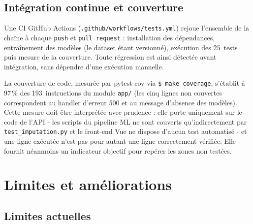 \documentclass[12pt,a4paper,openany]{report}
\newcommand{\file}[1]{\texttt{#1}}
\newcommand{\cmd}[1]{\texttt{\$ #1}}
\begin{document}
\section{Intégration continue et couverture}

Une CI GitHub Actions (\file{.github/workflows/tests.yml}) rejoue l'ensemble de la chaîne à chaque \texttt{push} et \texttt{pull request} : installation des dépendances, entraînement des modèles (le dataset étant versionné), exécution des 25~tests puis mesure de la couverture. Toute régression est ainsi détectée avant intégration, sans dépendre d'une exécution manuelle.

La couverture de code, mesurée par pytest-cov via \cmd{make coverage}, s'établit à 97\,\% des 193~instructions du module \file{app/} (les cinq lignes non couvertes correspondent au handler d'erreur 500 et au message d'absence des modèles). Cette mesure doit être interprétée avec prudence : elle porte uniquement sur le code de l'API - les scripts du pipeline ML ne sont couverts qu'indirectement par \file{test\_imputation.py} et le front-end Vue ne dispose d'aucun test automatisé - et une ligne exécutée n'est pas pour autant une ligne correctement vérifiée. Elle fournit néanmoins un indicateur objectif pour repérer les zones non testées.


\chapter{Limites et améliorations}

\section{Limites actuelles}
\end{document}
